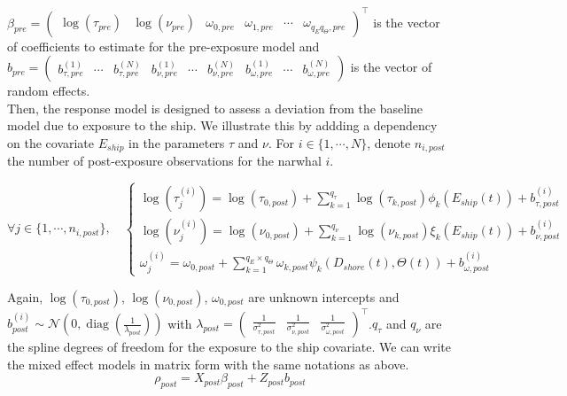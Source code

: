 \documentclass[11pt]{article}
\DeclareMathOperator{\diag}{diag}
\newcommand {\1}{\mathbb{1}}
\begin{document}
$\beta_{pre}=\begin{pmatrix}
	\log(\tau_{pre}) &
	\log(\nu_{pre})  &
	\omega_{0,pre} &
	\omega_{1,pre} &
	\cdots & 
	\omega_{q_E q_{\Theta},pre}
\end{pmatrix}^\top$ is the vector of coefficients to estimate for the pre-exposure model and $b_{pre}=\begin{pmatrix}  b_{\tau,pre}^{(1)} &\cdots& b_{\tau,pre}^{(N)} &b_{\nu,pre}^{(1)}& \cdots & b_{\nu,pre}^{(N)} & b_{\omega,pre}^{(1)} & \cdots & b_{\omega,pre}^{(N)} \end{pmatrix}$ is the vector of random effects.\\

Then, the response model is designed to assess a deviation from the baseline model due to exposure to the ship. We illustrate this by addding a dependency on the covariate $E_{ship}$ in the parameters $\tau$ and $\nu$. 
For $i \in \{1, \cdots, N\}$, denote $n_{i,post}$ the number of post-exposure observations for the narwhal $i$.

\begin{equation} 
	\forall j \in \{1,\cdots, n_{i,post}\}, \quad 
	\left\{\begin{array}{l}
		
		\log(\tau^{(i)}_j)=\log(\tau_{0,post}) +\sum_{k=1}^{q_{\tau}} \log(\tau_{k,post})\phi_{k}(E_{ship}(t))+b^{(i)}_{\tau,post} \\
		\log(\nu^{(i)}_j)=\log(\nu_{0,post}) +  \sum_{k=1}^{q_{\nu}} \log(\nu_{k,post}) \xi_{k}(E_{ship}(t)) +b^{(i)}_{\nu,post}  \\
		\omega^{(i)}_j=\omega_{0,post}+\sum_{k=1}^{q_E\times q_{\Theta}} \omega_{k,post} \psi_k(D_{shore}(t),\Theta(t)) + b_{\omega,post}^{(i)}
	\end{array}
	\right.
	\label{eq: response model}
\end{equation}

Again, $\log(\tau_{0,post})$, $\log(\nu_{0,post})$, $\omega_{0,post}$ are unknown intercepts and $b^{(i)}_{post} \sim \mathcal{N}\left( 0, \diag\left(\frac{1}{\lambda_{post}}\right)\right)$ with $\lambda_{post}=\begin{pmatrix} \frac{1}{\sigma_{\tau,post}^2} & \frac{1}{\sigma_{\nu,post}^2} & \frac{1}{\sigma_{\omega,post}^2} \end{pmatrix}^\top$.$q_{\tau}$ and $q_{\nu}$ are the spline degrees of freedom for the exposure to the ship covariate.
We can write the mixed effect models in matrix form with the same notations as above.
\begin{equation}
	\rho_{post}
	=X_{post} \beta_{post}
	+Z_{post} b_{post}
\end{equation}
\end{document}
